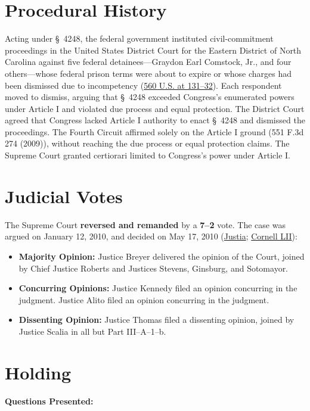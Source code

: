 \documentclass[12pt]{article}
\begin{document}
\section{Procedural History}
Acting under \S~4248, the federal government instituted civil-commitment proceedings in the United States District Court for the Eastern District of North Carolina against five federal detainees---Graydon Earl Comstock, Jr., and four others---whose federal prison terms were about to expire or whose charges had been dismissed due to incompetency (\href{https://www.law.cornell.edu/supct/html/08-1224.ZO.html}{560 U.S. at 131--32}). Each respondent moved to dismiss, arguing that \S~4248 exceeded Congress's enumerated powers under Article I and violated due process and equal protection. The District Court agreed that Congress lacked Article I authority to enact \S~4248 and dismissed the proceedings. The Fourth Circuit affirmed solely on the Article I ground (551 F.3d 274 (2009)), without reaching the due process or equal protection claims. The Supreme Court granted certiorari limited to Congress's power under Article I.

\section{Judicial Votes}
The Supreme Court \textbf{reversed and remanded} by a \textbf{7--2} vote. The case was argued on January 12, 2010, and decided on May 17, 2010 (\href{https://supreme.justia.com/cases/federal/us/560/126/}{Justia}; \href{https://www.law.cornell.edu/supremecourt/text/08-1224}{Cornell LII}):

\begin{itemize}
    \item \textbf{Majority Opinion:} Justice Breyer delivered the opinion of the Court, joined by Chief Justice Roberts and Justices Stevens, Ginsburg, and Sotomayor.
    \item \textbf{Concurring Opinions:} Justice Kennedy filed an opinion concurring in the judgment. Justice Alito filed an opinion concurring in the judgment.
    \item \textbf{Dissenting Opinion:} Justice Thomas filed a dissenting opinion, joined by Justice Scalia in all but Part III--A--1--b.
\end{itemize}

\section{Holding}
\textbf{Questions Presented:}
\end{document}

